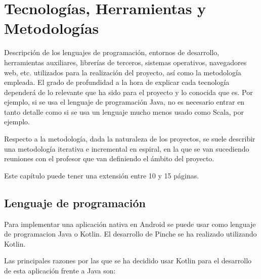 \cleardoublepage
\chapter{Tecnologías, Herramientas y Metodologías}

Descripción de los lenguajes de programación, entornos de desarrollo, herramientas auxiliares, librerías de terceros, sistemas operativos, navegadores web, etc. utilizados para la realización del proyecto, así como la metodología empleada. El grado de profundidad a la hora de explicar cada tecnología dependerá de lo relevante que ha sido para el proyecto y lo conocida que es. Por ejemplo, si se usa el lenguaje de programación Java, no es necesario entrar en tanto detalle como si se usa un lenguaje mucho menos usado como Scala, por ejemplo.

Respecto a la metodología, dada la naturaleza de los proyectos, se suele describir una metodología iterativa e incremental en espiral, en la que se van sucediendo reuniones con el profesor que van definiendo el ámbito del proyecto.

Este capítulo puede tener una extensión entre 10 y 15 páginas.

\section{Lenguaje de programación}

Para implementar una aplicación nativa en Android se puede usar como lenguaje de programacion Java o Kotlin.
El desarrollo de Pinche se ha realizado utilizando Kotlin.

Las principales razones por las que se ha decidido usar Kotlin para el desarrollo de esta aplicación frente a Java son:

